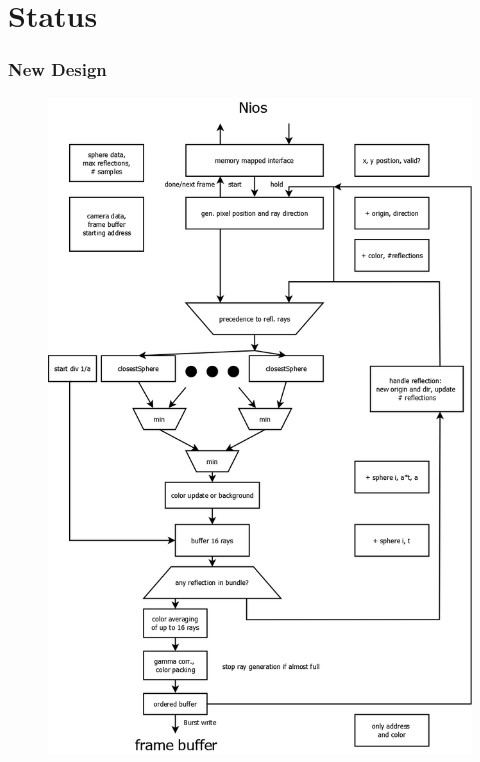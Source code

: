 \documentclass{beamer}
\begin{document}
\section{Status}
\begin{frame} %
	\frametitle{New Design} %
	\begin{figure}
		\includegraphics[height=0.8\textheight]{pics/pipeNeu.png}
	\end{figure}
  \end{frame}
\end{document}
